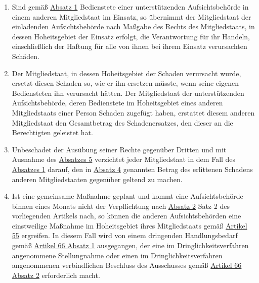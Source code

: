 \begin{enumerate}
  \item Sind gemäß \hyperref[itm:62-1]{Absatz 1} Bedienstete einer unterstützenden Aufsichtsbehörde in einem anderen
   Mitgliedstaat im Einsatz, so übernimmt der Mitgliedstaat der einladenden Aufsichtsbehörde nach Maßgabe des Rechts
   des Mitgliedstaats, in dessen Hoheitsgebiet der Einsatz erfolgt, die Verantwortung für ihr Handeln, einschließlich
   der Haftung für alle von ihnen bei ihrem Einsatz verursachten Schäden.
  \label{itm:62-4}

  \item Der Mitgliedstaat, in dessen Hoheitsgebiet der Schaden verursacht wurde, ersetzt diesen Schaden so, wie er ihn
   ersetzen müsste, wenn seine eigenen Bediensteten ihn verursacht hätten. Der Mitgliedstaat der unterstützenden
   Aufsichtsbehörde, deren Bedienstete im Hoheitsgebiet eines anderen Mitgliedstaats einer Person Schaden zugefügt
   haben, erstattet diesem anderen Mitgliedstaat den Gesamtbetrag des Schadenersatzes, den dieser an die Berechtigten
   geleistet hat.
  \label{itm:62-5}

  \item Unbeschadet der Ausübung seiner Rechte gegenüber Dritten und mit Ausnahme des \hyperref[itm:62-5]{Absatzes 5}
   verzichtet jeder Mitgliedstaat in dem Fall des \hyperref[itm:62-1]{Absatzes 1} darauf, den in \hyperref[itm:62-4]
   {Absatz 4} genannten Betrag des erlittenen Schadens anderen Mitgliedstaaten gegenüber geltend zu machen.
  \label{itm:62-6}

  \item Ist eine gemeinsame Maßnahme geplant und kommt eine Aufsichtsbehörde binnen eines Monats nicht der Verpflichtung
   nach \hyperref[itm:62-2]{Absatz 2} Satz 2 des vorliegenden Artikels nach, so können die anderen Aufsichtsbehörden
   eine einstweilige Maßnahme im Hoheitsgebiet ihres Mitgliedstaats gemäß \hyperref[ch:55]{Artikel 55} ergreifen. In
   diesem Fall wird von einem dringenden Handlungsbedarf gemäß \hyperref[itm:66-1]{Artikel 66 Absatz 1} ausgegangen,
   der eine im Dringlichkeitsverfahren angenommene Stellungnahme oder einen im Dringlichkeitsverfahren angenommenen
   verbindlichen Beschluss des Ausschusses gemäß \hyperref[itm:66-2]{Artikel 66 Absatz 2} erforderlich macht.
  \label{itm:62-7}

\end{enumerate}   


